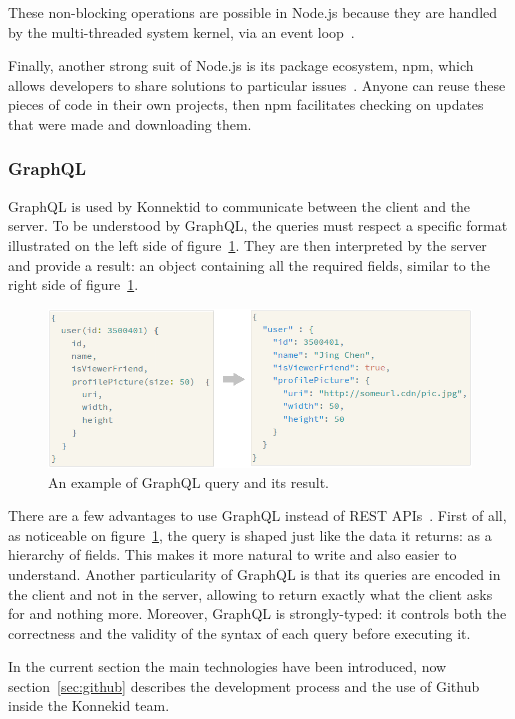 These non-blocking operations are possible in Node.js because they are handled by the multi-threaded system kernel, via an event loop~\cite{eventLoop}.

Finally, another strong suit of Node.js is its package ecosystem, npm, which allows developers to share solutions to particular issues~\cite{npm}. Anyone can reuse these pieces of code in their own projects, then npm facilitates checking on updates that were made and downloading them.

\subsubsection{GraphQL}
\label{sssec:grqphql}

GraphQL is used by Konnektid to communicate between the client and the server. To be understood by GraphQL, the queries must respect a specific format illustrated on the left side of {\sc figure}~\ref{fig:query}. They are then interpreted by the server and provide a result: an object containing all the required fields, similar to the right side of {\sc figure}~\ref{fig:query}.

\begin{figure}[H]
    \centering
    \includegraphics[scale=0.8]{figure/query.png}
    \caption{An example of GraphQL query and its result.}
    \label{fig:query}
\end{figure}

There are a few advantages to use GraphQL instead of REST APIs~\cite{graphQL}. First of all, as noticeable on {\sc figure}~\ref{fig:query}, the query is shaped just like the data it returns: as a hierarchy of fields. This makes it more natural to write and also easier to understand. Another particularity of GraphQL is that its queries are encoded in the client and not in the server, allowing to return exactly what the client asks for and nothing more. Moreover, GraphQL is strongly-typed: it controls both the correctness and the validity of the syntax of each query before executing it.

In the current section the main technologies have been introduced, now {\sc section}~\ref{sec:github} describes the development process and the use of Github inside the Konnekid team.
